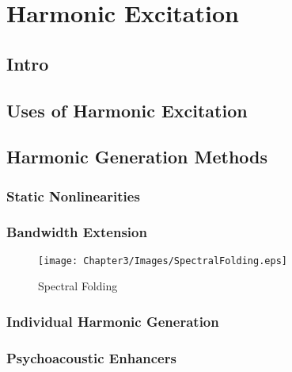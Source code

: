 
\chapter{Harmonic Excitation}

\section{Intro}

\section{Uses of Harmonic Excitation}

\section{Harmonic Generation Methods}
	\subsection{Static Nonlinearities}

	\subsection{Bandwidth Extension}
		\begin{figure}[h!]
			\centering
			\texttt{[image: Chapter3/Images/SpectralFolding.eps]}
			\caption{Spectral Folding}
		\end{figure}

	\subsection{Individual Harmonic Generation}

	\subsection{Psychoacoustic Enhancers}
